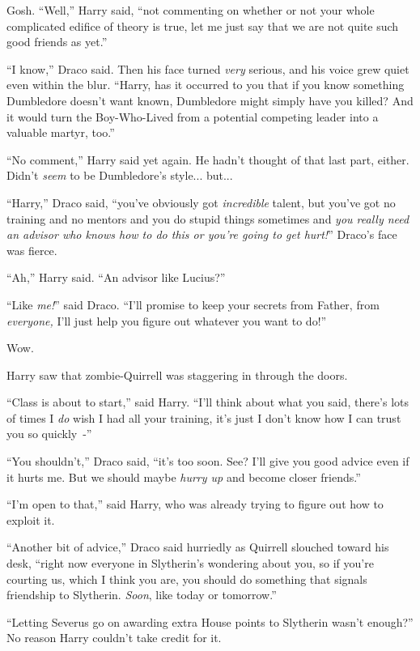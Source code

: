 Gosh. ``Well,'' Harry said, ``not commenting on whether or not your whole complicated edifice of theory is true, let me just say that we are not quite such good friends as yet.''

``I know,'' Draco said. Then his face turned \emph{very} serious, and his voice grew quiet even within the blur. ``Harry, has it occurred to you that if you know something Dumbledore doesn't want known, Dumbledore might simply have you killed? And it would turn the Boy-Who-Lived from a potential competing leader into a valuable martyr, too.''

``No comment,'' Harry said yet again. He hadn't thought of that last part, either. Didn't \emph{seem} to be Dumbledore's style... but...

``Harry,'' Draco said, ``you've obviously got \emph{incredible} talent, but you've got no training and no mentors and you do stupid things sometimes and \emph{you really need an advisor who knows how to do this or you're going to get hurt!}'' Draco's face was fierce.

``Ah,'' Harry said. ``An advisor like Lucius?''

``Like \emph{me!}'' said Draco. ``I'll promise to keep your secrets from Father, from \emph{everyone,} I'll just help you figure out whatever you want to do!''

Wow.

Harry saw that zombie-Quirrell was staggering in through the doors.

``Class is about to start,'' said Harry. ``I'll think about what you said, there's lots of times I \emph{do} wish I had all your training, it's just I don't know how I can trust you so quickly~-''

``You shouldn't,'' Draco said, ``it's too soon. See? I'll give you good advice even if it hurts me. But we should maybe \emph{hurry up} and become closer friends.''

``I'm open to that,'' said Harry, who was already trying to figure out how to exploit it.

``Another bit of advice,'' Draco said hurriedly as Quirrell slouched toward his desk, ``right now everyone in Slytherin's wondering about you, so if you're courting us, which I think you are, you should do something that signals friendship to Slytherin. \emph{Soon}, like today or tomorrow.''

``Letting Severus go on awarding extra House points to Slytherin wasn't enough?'' No reason Harry couldn't take credit for it.

